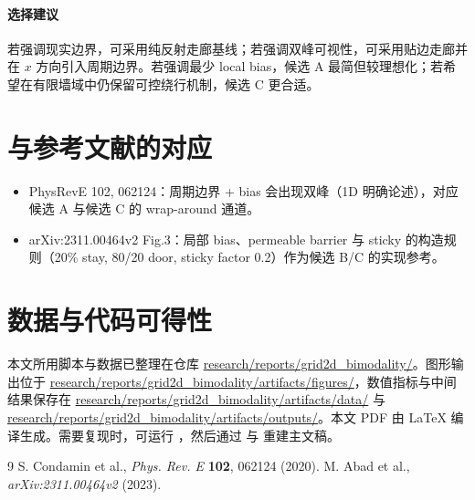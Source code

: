 \documentclass[11pt,fontset=fandol]{ctexart}
\begin{document}
\paragraph{选择建议} 若强调现实边界，可采用纯反射走廊基线；若强调双峰可视性，可采用贴边走廊并在 $x$ 方向引入周期边界。若强调最少 local bias，候选 A 最简但较理想化；若希望在有限墙域中仍保留可控绕行机制，候选 C 更合适。

\section{与参考文献的对应}
\begin{itemize}
  \item PhysRevE 102, 062124：周期边界 + bias 会出现双峰（1D 明确论述），对应候选 A 与候选 C 的 wrap-around 通道。
  \item arXiv:2311.00464v2 Fig.3：局部 bias、permeable barrier 与 sticky 的构造规则（20\% stay, 80/20 door, sticky factor 0.2）作为候选 B/C 的实现参考。
\end{itemize}

\section{数据与代码可得性}
本文所用脚本与数据已整理在仓库 \url{research/reports/grid2d_bimodality/}。图形输出位于 \url{research/reports/grid2d_bimodality/artifacts/figures/}，数值指标与中间结果保存在 \url{research/reports/grid2d_bimodality/artifacts/data/} 与 \url{research/reports/grid2d_bimodality/artifacts/outputs/}。本文 PDF 由 \LaTeX{} 编译生成。需要复现时，可运行 ，然后通过  与  重建主文稿。

\begin{thebibliography}{9}
   S. Condamin et al., \emph{Phys. Rev. E} \textbf{102}, 062124 (2020).
   M. Abad et al., \emph{arXiv:2311.00464v2} (2023).
\end{thebibliography}
\end{document}
